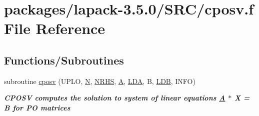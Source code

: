 \hypertarget{cposv_8f}{}\section{packages/lapack-\/3.5.0/\+S\+R\+C/cposv.f File Reference}
\label{cposv_8f}
\subsection*{Functions/\+Subroutines}
\begin{DoxyCompactItemize}
\item 
subroutine \hyperlink{group__complexPOsolve_gad6fa5e367df37b944f5224b5dcc6ab50}{cposv} (U\+P\+L\+O, \hyperlink{polmisc_8c_a0240ac851181b84ac374872dc5434ee4}{N}, \hyperlink{example__user_8c_aa0138da002ce2a90360df2f521eb3198}{N\+R\+H\+S}, \hyperlink{classA}{A}, \hyperlink{example__user_8c_ae946da542ce0db94dced19b2ecefd1aa}{L\+D\+A}, B, \hyperlink{example__user_8c_a50e90a7104df172b5a89a06c47fcca04}{L\+D\+B}, I\+N\+F\+O)
\begin{DoxyCompactList}\small\item\em {\bfseries  C\+P\+O\+S\+V computes the solution to system of linear equations \hyperlink{classA}{A} $\ast$ X = B for P\+O matrices} \end{DoxyCompactList}\end{DoxyCompactItemize}
